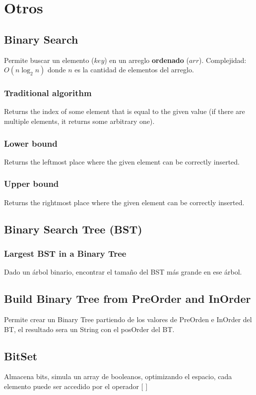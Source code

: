 \documentclass[10pt,letterpaper,twocolumn]{article}
\newcommand{\source}[1]{
  
  \dotfill
}
\begin{document}
\section{Otros}
  \subsection{Binary Search}
    Permite buscar un elemento ($key$) en un arreglo \textbf{ordenado} ($arr$).
    Complejidad: $O(n \log_2 n)$ donde $n$ es la cantidad de elementos del arreglo.\\
    \source{./src/binarySearch.cpp}
    \subsubsection{Traditional algorithm}
      Returns the index of some element that is equal to the given value (if there are multiple
      elements, it returns some arbitrary one).
      \source{./src/binary_search.cpp}
    \subsubsection{Lower bound}
      Returns the leftmost place where the given element can be correctly inserted.
      \source{./src/lower_bound.cpp}
    \subsubsection{Upper bound}
      Returns the rightmost place where the given element can be correctly inserted.
      \source{./src/upper_bound.cpp}
  \subsection{Binary Search Tree (BST)}
    \subsubsection{Largest BST in a Binary Tree}
      Dado un árbol binario, encontrar el tamaño del BST más grande en ese árbol.
      \source{./src/largest_bst.java}
  \subsection{Build Binary Tree from PreOrder and InOrder}
    Permite crear un Binary Tree partiendo de los valores de PreOrden e InOrder del BT, el resultado sera un String con el posOrder del BT.
    \source{./src/build-BT-from-pre-in.cpp}
  \subsection{BitSet}
    Almacena bits, simula un array de booleanos, optimizando el espacio, cada elemento puede ser accedido por el operador $[$ $]$\\
    \source{./src/bitset.cpp}
\end{document}

